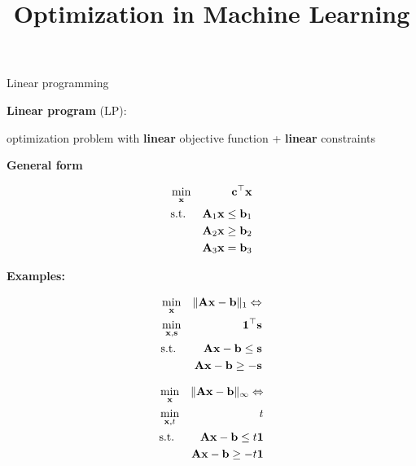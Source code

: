 \documentclass[11pt,compress,t,notes=noshow, xcolor=table]{beamer}
\title{Optimization in Machine Learning}
\begin{document}

\begin{vbframe}{Linear programming}

\textbf{Linear program} (LP):
\begin{center}
    optimization problem with \textbf{linear} objective function + \textbf{linear} constraints
\end{center}

\textbf{General form}
\vspace*{-1cm}

\begin{eqnarray*}
\min_{\mathbf{x}} && \mathbf{c}^\top\mathbf{x} \\
\text{s.t. } && \mathbf{A}_1\mathbf{x} \le \mathbf{b}_1\\
&& \mathbf{A}_2\mathbf{x} \ge \mathbf{b}_2 \\
&& \mathbf{A}_3\mathbf{x} = \mathbf{b}_3
\end{eqnarray*}

\textbf{Examples:}\\
\begin{minipage}{0.45\textwidth}
    \begin{eqnarray*}
        \min_{\mathbf{x}} && \|\mathbf{A}\mathbf{x}-\mathbf{b}\|_1 \Leftrightarrow\\
        \min_{\mathbf{x},\mathbf{s}} && \bm{1}^\top\mathbf{s} \\
        \text{s.t. } && \mathbf{A}\mathbf{x} - \mathbf{b} \le \mathbf{s}\\
        && \mathbf{A}\mathbf{x} - \mathbf{b} \ge -\mathbf{s}
    \end{eqnarray*}
\end{minipage}
\hfill
\begin{minipage}{0.45\textwidth}
    \begin{eqnarray*}
        \min_{\mathbf{x}} && \|\mathbf{A}\mathbf{x}-\mathbf{b}\|_\infty \Leftrightarrow\\
        \min_{\mathbf{x},t} && t \\
        \text{s.t. } && \mathbf{A}\mathbf{x} - \mathbf{b} \le t\bm{1}\\
        && \mathbf{A}\mathbf{x} - \mathbf{b} \ge -t\bm{1}
    \end{eqnarray*}
\end{minipage}


\end{vbframe}
\end{document}
